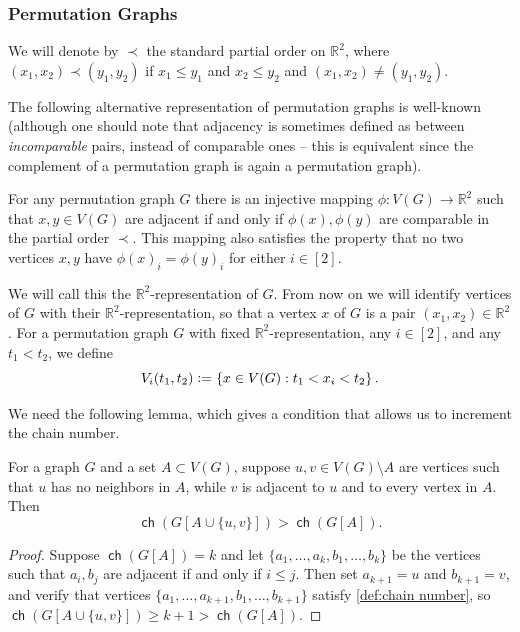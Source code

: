 \documentclass{theoretics}
\newcommand{\define}{\vcentcolon=}
\newcommand{\bR}{\ensuremath{\mathbb{R}}}
\DeclareMathOperator\ch{\mathsf{ch}}
\begin{document}
\subsubsection{Permutation Graphs}
\label{section:permutation graphs}

We will denote by $\prec$ the standard partial order on $\bR^2$, where $(x_1,x_2) \prec (y_1,y_2)$ if $x_1 \leq y_1$ and $x_2 \leq y_2$ and $(x_1,x_2) \neq (y_1,y_2)$. 

The following alternative representation of permutation graphs is well-known (although one should
note that adjacency is sometimes defined as between \emph{incomparable} pairs, instead of comparable
ones -- this is equivalent since the complement of a permutation graph is again a permutation
graph).
\begin{proposition}
	For any permutation graph $G$ there is an injective mapping $\phi : V(G) \to \bR^2$ such that $x,y
	\in V(G)$ are adjacent if and only if $\phi(x),\phi(y)$ are comparable in the partial order $\prec$.
	This mapping also satisfies the property that no two vertices $x,y$ have $\phi(x)_i=\phi(y)_i$ for
	either $i \in [2]$.
\end{proposition}

We will call this the $\bR^2$-representation of $G$. From now on we will identify vertices of $G$
with their $\bR^2$-representation, so that a vertex $x$ of $G$ is a pair $(x_1,x_2) \in \bR^2$.  For
a permutation graph $G$ with fixed $\bR^2$-representation, any $i \in [2]$, and any $t_1 < t_2$, we
define
\[
V_i(t_1,t_2) \define \{ x \in V(G) : t_1 < x_i < t_2 \} \,.
\]

We need the following lemma, which gives a condition that allows us to
increment the chain number.

\begin{lemma}
	\label{lemma:increment chain number}
	For a graph $G$ and a set $A \subset V(G)$, suppose $u,v \in V(G) \setminus A$ are vertices such
	that $u$ has no neighbors in $A$, while $v$ is adjacent to $u$ and to every vertex in $A$. Then
	\[\ch(G[A \cup \{u,v\}]) > \ch(G[A]).\]
\end{lemma}
\begin{proof}
	Suppose $\ch(G[A])=k$ and
	let $\{ a_1, \dotsc, a_k, b_1, \dotsc, b_k\}$ be the vertices such that $a_i,b_j$ are adjacent if
	and only if $i \leq j$. Then set $a_{k+1} = u$ and $b_{k+1} = v$, and verify that
	vertices $\{a_1, \dotsc, a_{k+1}, b_1, \dotsc, b_{k+1}\}$ satisfy \cref{def:chain number}, so
	$\ch(G[A \cup \{u,v\}]) \geq k+1 > \ch(G[A])$.
\end{proof}
\end{document}
